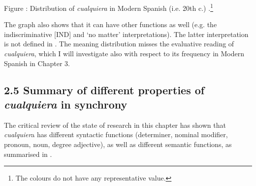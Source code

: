 \documentclass[output=paper]{langscibook}
\begin{document}
\begin{styletablecaption}
Figure : Distribution of \textit{cualquiera} in Modern Spanish (i.e. 20th c.) \citet[19]{AloniEtAl2010}.\footnote{ \textrm{The colours do not have any representative value.}}
\end{styletablecaption}

The graph also shows that it can have other functions as well (e.g. the indiscriminative [IND] and ‘no matter’ interpretations). The latter interpretation is not defined in . The meaning distribution misses the evaluative reading of \textit{cualquiera}, which I will investigate also with respect to its frequency in Modern Spanish in Chapter 3.

\subsection{\textbf{2.5} \textbf{Summary} \textbf{of} \textbf{different} \textbf{properties} \textbf{of} \textbf{\textit{cualquiera}} \textbf{in} \textbf{synchrony}}

The critical review of the state of research in this chapter has shown that \textit{cualquier}a has different syntactic functions (determiner, nominal modifier, pronoun, noun, degree adjective), as well as different semantic functions, as summarised in .
\end{document}
